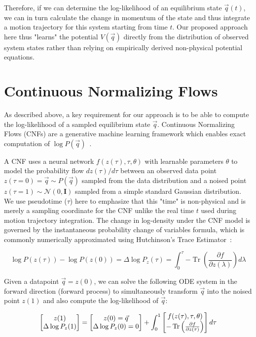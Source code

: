 \documentclass[a4paper,11pt]{article}
\begin{document}
Therefore, if we can determine the log-likelihood of an equilibrium state $\vec{q}(t)$, we can in turn calculate the change in momentum of the state and thus integrate a motion trajectory for this system starting from time $t$. Our proposed approach here thus "learns" the potential $V(\vec{q})$ directly from the distribution of observed system states rather than relying on empirically derived non-physical potential equations.

\section{Continuous Normalizing Flows}
As described above, a key requirement for our approach is to be able to compute the log-likelihood of a sampled equilibrium state $\vec{q}$. Continuous Normalizing Flows (CNFs) are a generative machine learning framework which enables exact computation of  $\log{P(\vec{q})}$~\cite{grathwohl2018,chen2018}.
\

A CNF uses a neural network $f(z(\tau), \tau, \theta)$ with learnable parameters $\theta$ to model the probability flow $dz(\tau)/d\tau$ between an observed data point $z(\tau =0) = \vec{q} \sim P(\vec{q})$ sampled from the data distribution and a noised point $z(\tau = 1) \sim \mathcal{N}(0, \mathbf{I})$ sampled from a simple standard Gaussian distribution. We use pseudotime ($\tau$) here to emphasize that this "time" is non-physical and is merely a sampling coordinate for the CNF unlike the real time $t$ used during motion trajectory integration. The change in log-density under the CNF model is governed by the instantaneous probability change of variables formula, which is commonly numerically approximated using Hutchinson's Trace Estimator~\cite{chen2018}:

$$\log{P(z(\tau))} - \log P(z(0)) = \Delta\log{P_z}(\tau) =\int_{0}^{\tau}{-\operatorname{Tr}\left(\frac{\partial f}{\partial z(\lambda)}\right)d\lambda}$$ 

Given a datapoint $\vec{q} = z(0)$, we can solve the following ODE system in the forward direction (forward process) to simultaneously transform $\vec{q}$ into the noised point $z(1)$ and also compute the log-likelihood of $\vec{q}$:

$$
    \begin{bmatrix}
    z(1)\\
    \Delta\log{P_z}(1)
    \end{bmatrix} = 
    \begin{bmatrix}
    z(0) = \vec{q}\\
    \Delta\log{P_z}(0) = 0
    \end{bmatrix} + 
    \int_0^1
    \begin{bmatrix}
    f(z(\tau), \tau, \theta)\\
    -\operatorname{Tr}\left(\frac{\partial f}{\partial z(\tau)}\right)
    \end{bmatrix} d\tau \\
$$
\end{document}
